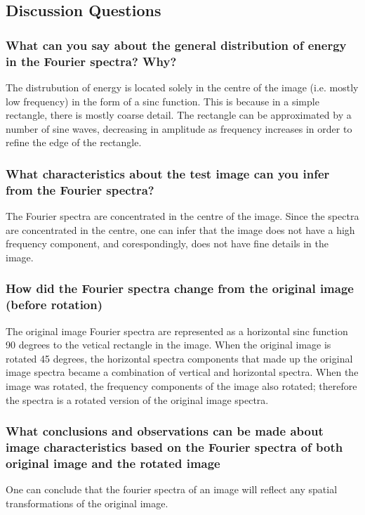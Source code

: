 \documentclass[article, 1.5space, letterpaper, 12pt, oneside, header, footer]{SydeClass}
\begin{document}
\subsection{Discussion Questions}

\subsubsection{What can you say about the general distribution of energy in the Fourier spectra? Why?}
The distrubution of energy is located solely in the centre of the image (i.e. mostly low frequency) in the form of a sinc function. This is because in a simple rectangle, there is mostly coarse detail. The rectangle can be approximated by a number of sine waves, decreasing in amplitude as frequency increases in order to refine the edge of the rectangle.

\subsubsection{What characteristics about the test image can you infer from the Fourier spectra?}
The Fourier spectra are concentrated in the centre of the image. Since the spectra are concentrated in the centre, one can infer that the image does not have a high frequency component, and corespondingly, does not have fine details in the image.

\subsubsection{How did the Fourier spectra change from the original image (before rotation)}
The original image Fourier spectra are represented as a horizontal sinc function 90 degrees to the vetical rectangle in the image. When the original image is rotated 45 degrees, the horizontal spectra components that made up the original image spectra became a combination of vertical and horizontal spectra. When the image was rotated, the frequency components of the image also rotated; therefore the spectra is a rotated version of the original image spectra.

\subsubsection{ What conclusions and observations can be made about image characteristics based on the Fourier
spectra of both original image and the rotated image}
One can conclude that the fourier spectra of an image will reflect any spatial transformations of the original image.
\end{document}
